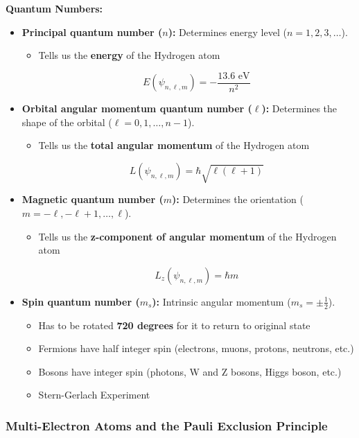\documentclass{article}
\newcommand{\eqbox}[1]{\begin{tcolorbox}[colback=gray!10] #1 \end{tcolorbox}}
\newcommand{\conceptbox}[1]{\begin{tcolorbox}[colback=blue!10] #1 \end{tcolorbox}}
\begin{document}
\conceptbox{
\textbf{Quantum Numbers:}
\begin{itemize}
    \item \textbf{Principal quantum number (\( n \)):} Determines energy level (\( n = 1, 2, 3, \dots \)).
    \begin{itemize}
        \item Tells us the \textbf{energy} of the Hydrogen atom
        \eqbox{
            \[
                E(\psi_{n, \ell, m}) = -\frac{13.6\text{ eV}}{n^2}
            \]
        }
    \end{itemize}
    \item \textbf{Orbital angular momentum quantum number (\( \ell \)):} Determines the shape of the orbital (\( \ell = 0, 1, \dots, n-1 \)).
    \begin{itemize}
        \item Tells us the \textbf{total angular momentum} of the Hydrogen atom
        \eqbox{
            \[
                L(\psi_{n, \ell, m}) = \hbar \sqrt{\ell(\ell + 1)}
            \]
        }
    \end{itemize}
    \item \textbf{Magnetic quantum number (\( m \)):} Determines the orientation (\( m = -\ell, -\ell+1, \dots, \ell \)).
    \begin{itemize}
        \item Tells us the \textbf{z-component of angular momentum} of the Hydrogen atom
        \eqbox{
            \[
                L_z(\psi_{n, \ell, m}) = \hbar m
            \]
        }
    \end{itemize}
    \item \textbf{Spin quantum number (\( m_s \)):} Intrinsic angular momentum (\( m_s = \pm \frac{1}{2} \)).
    \begin{itemize}
        \item Has to be rotated \textbf{720 degrees} for it to return to original state
        \item Fermions have half integer spin (electrons, muons, protons, neutrons, etc.)
        \item Bosons have integer spin (photons, W and Z bosons, Higgs boson, etc.)
        \item Stern-Gerlach Experiment
    \end{itemize}
\end{itemize}
}

\subsubsection{Multi-Electron Atoms and the Pauli Exclusion Principle}
\end{document}
